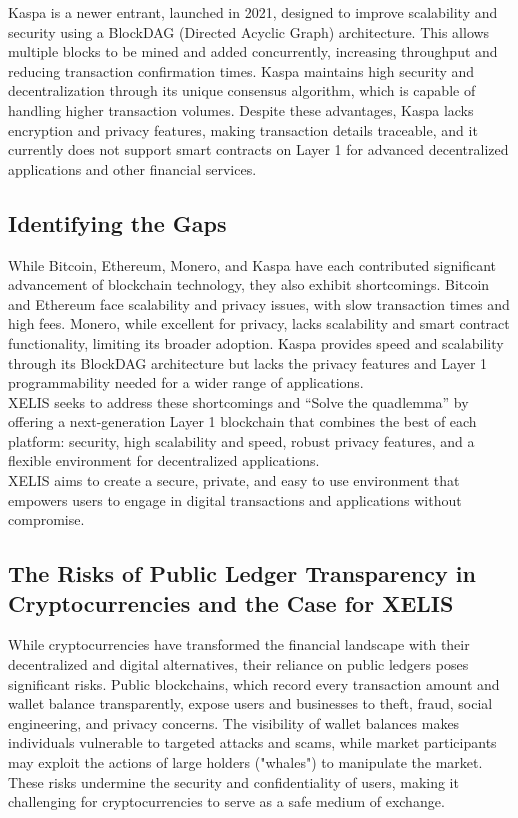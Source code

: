 \documentclass[12pt,a4paper,twocolumn]{article}
\begin{document}
Kaspa is a newer entrant, launched in 2021, designed to improve scalability and security using a BlockDAG (Directed Acyclic Graph) architecture. This allows multiple blocks to be mined and added concurrently, increasing throughput and reducing transaction confirmation times. Kaspa maintains high security and decentralization through its unique consensus algorithm, which is capable of handling higher transaction volumes. Despite these advantages, Kaspa lacks encryption and privacy features, making transaction details traceable, and it currently does not support smart contracts on Layer 1 for advanced decentralized applications and other financial services.\\


\subsection{Identifying the Gaps}

While Bitcoin, Ethereum, Monero, and Kaspa have each contributed significant advancement of blockchain technology, they also exhibit shortcomings. Bitcoin and Ethereum face scalability and privacy issues, with slow transaction times and high fees. Monero, while excellent for privacy, lacks scalability and smart contract functionality, limiting its broader adoption. Kaspa provides speed and scalability through its BlockDAG architecture but lacks the privacy features and Layer 1 programmability needed for a wider range of applications.\\

XELIS seeks to address these shortcomings and “Solve the quadlemma” by offering a next-generation Layer 1 blockchain that combines the best of each platform: security, high scalability and speed, robust privacy features, and a flexible environment for decentralized applications.\\

XELIS aims to create a secure, private, and easy to use environment that empowers users to engage in digital transactions and applications without compromise.\\


\subsection{The Risks of Public Ledger Transparency in Cryptocurrencies and the Case for XELIS}

While cryptocurrencies have transformed the financial landscape with their decentralized and digital alternatives, their reliance on public ledgers poses significant risks. Public blockchains, which record every transaction amount and wallet balance transparently, expose users and businesses to theft, fraud, social engineering, and privacy concerns. The visibility of wallet balances makes individuals vulnerable to targeted attacks and scams, while market participants may exploit the actions of large holders ("whales") to manipulate the market. These risks undermine the security and confidentiality of users, making it challenging for cryptocurrencies to serve as a safe medium of exchange.\\
\end{document}
